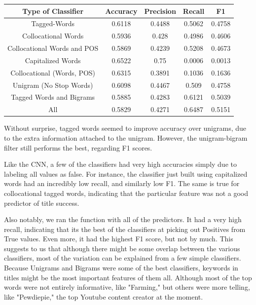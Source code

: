 \documentclass[a4paper,12pt]{article}
\begin{document}
\begin{center}
 \begin{tabular}{|c| c| c| c| c|} 
 \hline
 Type of Classifier & Accuracy & Precision & Recall & F1 \\ [0.5ex] 
\hline
 Tagged-Words  & 0.6118  & 0.4488  &0.5062  & 0.4758\\ 
 \hline
 Collocational Words & 0.5936  & 0.428  &0.4986  & 0.4606\\
 \hline
Collocational Words and POS & 0.5869& 0.4239 & 0.5208& 0.4673\\
\hline
 Capitalized Words & 0.6522  & 0.75 & 0.0006 & 0.0013\\
 \hline
 Collocational (Words, POS)& 0.6315 & 0.3891 & 0.1036 & 0.1636\\
 \hline
 Unigram (No Stop Words) & 0.6098 & 0.4467 &0.509& 0.4758\\
 \hline
 Tagged Words and Bigrams & 0.5885 & 0.4283 & 0.6121& 0.5039\\
 \hline
 All &0.5829 & 0.4271 & 0.6487 &0.5151\\

 \hline

\end{tabular}
\end{center}

Without surprise, tagged words seemed to improve accuracy over unigrams, due to the extra information attached to the unigram. However, the unigram-bigram filter still performs the best, regarding F1 scores. 

Like the CNN, a few of the classifiers had very high accuracies simply due to labeling all values as false. For instance, the classifier just built using capitalized words had an incredibly low recall, and similarly low F1. The same is true for collocational tagged words, indicating that the particular feature was not a good predictor of title success.  

Also notably, we ran the function with all of the predictors. It had a very high recall, indicating that its the best of the classifiers at picking out Positives from True values. Even more, it had the highest F1 score, but not by much. This suggests to us that although there might be some overlap between the various classifiers, most of the variation can be explained from a few simple classifiers. 
\\

Because Unigrams and Bigrams were some of the best classifiers, keywords in titles might be the most important features of them all. Although most of the top words were not entirely informative, like "Farming," but others were more telling, like "Pewdiepie," the top Youtube content creator at the moment. 
\end{document}
